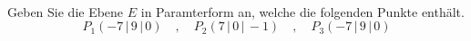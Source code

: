 \begin{aufgabe} ~ \\ 
Geben Sie die Ebene $E$ in Paramterform an, welche die folgenden Punkte enthält.\[P_1( -7\,|\,9\,|\,0) \quad,\quad P_2( 7\,|\,0\,|\,-1) \quad,\quad P_3( -7\,|\,9\,|\,0)\]\end{aufgabe} 
